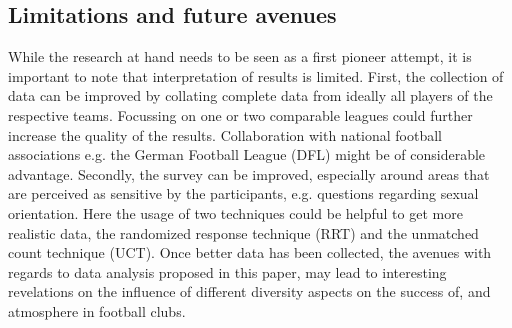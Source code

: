 \documentclass[	
	12pt, %
	a4paper, %
]{scrartcl}\usepackage[]{graphicx}\usepackage[]{color}
\begin{document}
\subsection{Limitations and future avenues}
While the research at hand needs to be seen as a first pioneer attempt, it is important to note that interpretation of results is limited. First, the collection of data can be improved by collating complete data from ideally all players of the respective teams. Focussing on one or two comparable leagues could further increase the quality of the results. Collaboration with national football associations e.g. the German Football League (DFL) might be of considerable advantage. Secondly, the survey can be improved, especially around areas that are perceived as sensitive by the participants, e.g. questions regarding sexual orientation. Here the usage of two techniques could be helpful to get more realistic data, the randomized response technique (RRT) and the unmatched count technique (UCT). Once better data has been collected, the avenues with regards to data analysis proposed in this paper, may lead to interesting revelations on the influence of different diversity aspects on the success of, and atmosphere in football clubs.


\clearpage

\renewcommand{\bibliographytypesize}{\small} %
\end{document}
